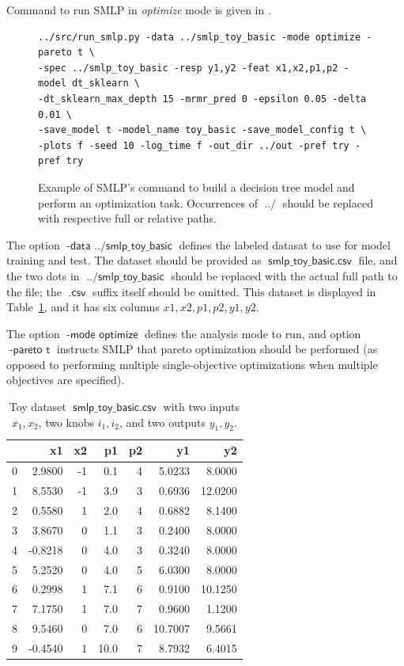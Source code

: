 \documentclass[a4paper,parskip=half]{article} %
\newcommand*\option[1]{\operatorname{\mathsf{#1}}} %
\newcommand*\optionval[2]{\operatorname{\mathsf{#1}\,\,\mathsf{#2}}} %
\newcommand*\suffix[1]{\operatorname{\mathsf{#1}}} %
\begin{document}
Command to run SMLP in \emph{optimize} mode is given in .

\begin{figure}[hb!]
\begin{verbatim}
../src/run_smlp.py -data ../smlp_toy_basic -mode optimize -pareto t \
-spec ../smlp_toy_basic -resp y1,y2 -feat x1,x2,p1,p2 -model dt_sklearn \
-dt_sklearn_max_depth 15 -mrmr_pred 0 -epsilon 0.05 -delta 0.01 \
-save_model t -model_name toy_basic -save_model_config t \
-plots f -seed 10 -log_time f -out_dir ../out -pref try -pref try
\end{verbatim}
\caption{Example of SMLP's command to build a decision tree model and perform an optimization task. 
Occurrences of $\suffix{../}$ should be replaced with respective full or relative paths.}
\label{fig:command}
\end{figure}

The option $\optionval{-data}{../smlp\_toy\_basic}$ defines the labeled datasat to use for model training and test.
The dataset should be provided as $\option{smlp\_toy\_basic.csv}$ file, and the two dots in $\option{../smlp\_toy\_basic}$ 
should be replaced with the actual full path to the file;  the $\suffix{.csv}$ suffix itself should be omitted.
This dataset is displayed in Table~\ref{toy_basic_df}, and it has six columns $x1, x2, p1, p2, y1, y2$.

The option $\optionval{-mode}{optimize}$ defines the analysis mode to run, and option $\optionval{-pareto}{t}$
instructs SMLP that pareto optimization should be performed (as opposed to performing multiple single-objective 
optimizations when multiple objectives are specified). 

\begin{table}[t]
\centering\small
\begin{tabular}{lrrrrrr}
\toprule %
{} &      x1 &  x2 &    p1 &  p2 &       y1 &       y2 \\
\midrule
0 &  2.9800 &  -1 &   0.1 &   4 &   5.0233 &   8.0000 \\
1 &  8.5530 &  -1 &   3.9 &   3 &   0.6936 &  12.0200 \\
2 &  0.5580 &   1 &   2.0 &   4 &   0.6882 &   8.1400 \\
3 &  3.8670 &   0 &   1.1 &   3 &   0.2400 &   8.0000 \\
4 & -0.8218 &   0 &   4.0 &   3 &   0.3240 &   8.0000 \\
5 &  5.2520 &   0 &   4.0 &   5 &   6.0300 &   8.0000 \\
6 &  0.2998 &   1 &   7.1 &   6 &   0.9100 &  10.1250 \\
7 &  7.1750 &   1 &   7.0 &   7 &   0.9600 &   1.1200 \\
8 &  9.5460 &   0 &   7.0 &   6 &  10.7007 &   9.5661 \\
9 & -0.4540 &   1 &  10.0 &   7 &   8.7932 &   6.4015 \\
\bottomrule
\end{tabular}
\caption{Toy dataset $\option{smlp\_toy\_basic.csv}$ with two inputs $x_1, x_2$, two knobs $i_1, i_2$, and two outputs $y_1, y_2$.}
\label{toy_basic_df}
\end{table}
\end{document}
